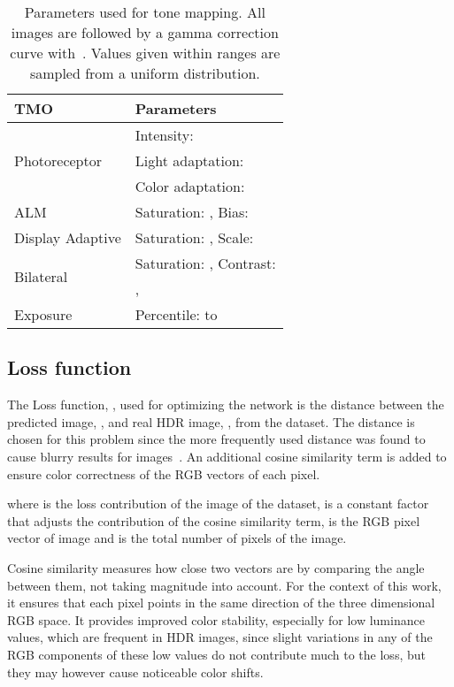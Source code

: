 \documentclass{egpubl}
\newcommand\la[1]{\multicolumn{1}{l}{#1}}
\begin{document}
\begin{table}[!t]
    \caption{Parameters used for tone mapping. All images are followed by a gamma
    correction curve with\ . Values given within ranges are
    sampled from a uniform distribution.}\label{table:tmo_param}
    \centering
    \begin{tabular}{ll}
    \toprule
    \bfseries TMO & \bfseries Parameters\\\midrule
    \la{\multirow{3}{*}{Photoreceptor}} & \la{Intensity: }\\
                                   & \la{Light adaptation: }\\
                                   & \la{Color adaptation: }\\\midrule
    \la{\multirow{1}{*}{ALM}}    & \la{Saturation:  , Bias: }\\\midrule
    \la{\multirow{1}{*}{Display Adaptive}}  & \la{Saturation:  , Scale: }\\\midrule
    \la{\multirow{2}{*}{Bilateral}}   & \la{Saturation:  , Contrast: }\\
                                   & \la{, }\\\midrule
    \la{\multirow{1}{*}{Exposure}} & \la{Percentile:  to }\\\bottomrule
    \end{tabular}
\end{table}

\subsection{\textbf{Loss function}}

The Loss function, , used for optimizing the network
is the  distance between the predicted image, , and real HDR image,
, from the dataset. The  distance is chosen for this
problem since the more frequently used  distance was found to cause blurry
results for images~\cite{mathieu2016mse}. An additional cosine similarity term
is added to ensure color correctness of the RGB vectors of each pixel.


where  is the loss contribution of the  image
of the dataset,  is a constant factor that adjusts the contribution of
the cosine similarity term,  is the  RGB pixel vector
of image  and  is the total number of pixels of the image.

Cosine similarity measures how close two vectors are by comparing the angle
between them, not taking magnitude into account. For the context of this work,
it ensures that each pixel points in the same direction of the three
dimensional RGB space. It provides improved color stability, especially for low
luminance values, which are frequent in HDR images, since slight variations in any of
the RGB components of these low values do not contribute much to the 
loss, but they may however cause noticeable color shifts.  
\end{document}
